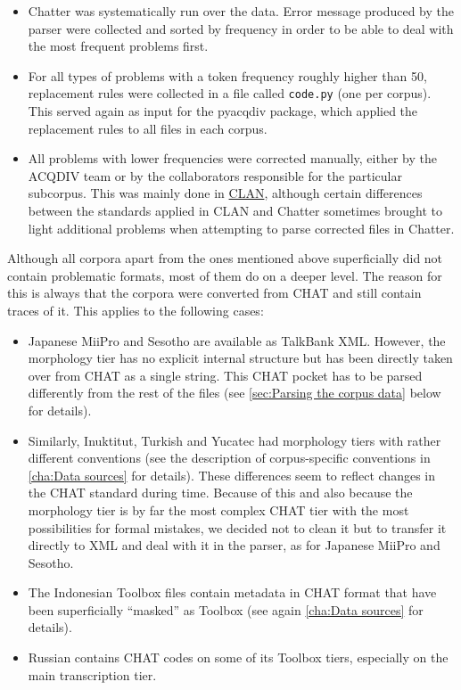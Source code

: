 \documentclass[a4paper, 11pt]{book}
\begin{document}
\begin{itemize} 
	\item Chatter was systematically run over the data. Error message produced by the parser were collected and sorted by frequency in order to be able to deal with the most frequent problems first. 
	\item For all types of problems with a token frequency roughly higher than 50, replacement rules were collected in a file called \texttt{code.py} (one per corpus). This served again as input for
		the pyacqdiv package, which applied the replacement rules to all files in each corpus. 
	\item All problems with lower frequencies were corrected manually, either by the ACQDIV team or by the collaborators responsible for the particular subcorpus. This was mainly done in \href{http://childes.psy.cmu.edu/clan/}{CLAN}, although
		certain differences between the standards applied in CLAN and Chatter sometimes brought to light additional problems when attempting to parse corrected files in Chatter. 
\end{itemize}

Although all corpora apart from the ones mentioned above superficially did not contain problematic formats, most of them do on a deeper level. The reason for this is always that the corpora were converted from CHAT and still contain traces of it. This applies to the following cases: 

\begin{itemize}
	\item Japanese MiiPro and Sesotho are available as TalkBank XML. However, the morphology tier has no explicit internal structure but has been directly taken over from CHAT as a single string. This CHAT pocket 
		has to be parsed differently from the rest of the files (see \autoref{sec:Parsing the corpus data} below for details). 
	\item Similarly, Inuktitut, Turkish and Yucatec had morphology tiers with rather different conventions (see the description of corpus-specific conventions in \autoref{cha:Data sources} for details). 
		These differences seem to reflect changes in the CHAT standard during time. Because of this and also because the morphology tier is by far the most complex CHAT tier with the most possibilities for formal mistakes, 
		we decided not to clean it but to transfer it directly to XML and deal with it in the parser, as for Japanese MiiPro and Sesotho. 
	\item The Indonesian Toolbox files contain metadata in CHAT format that have been superficially “masked” as Toolbox (see again \autoref{cha:Data sources} for details).
	\item Russian contains CHAT codes on some of its Toolbox tiers, especially on the main transcription tier. 
\end{itemize}
\end{document}
